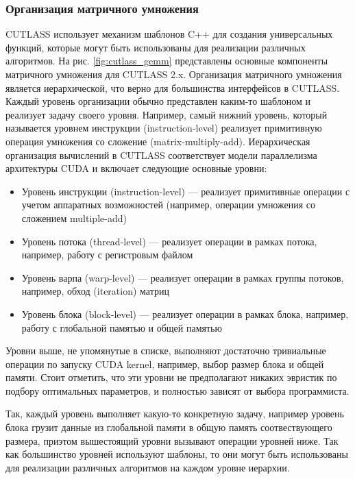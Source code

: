 \subsubsection{Организация матричного умножения}
CUTLASS использует механизм шаблонов C++ для создания универсальных функций, которые могут быть использованы для реализации различных алгоритмов.
На рис. \ref{fig:cutlass_gemm} представлены основные компоненты матричного умножения для CUTLASS 2.x. Организация матричного умножения является иерархической,
что верно для большинства интерфейсов в CUTLASS. Каждый уровень организации обычно представлен каким-то шаблоном и реализует задачу своего уровня. Например,
самый нижний уровень, который называется уровнем инструкции (instruction-level) реализует примитивную операция умножения со сложение (matrix-multiply-add).
Иерархическая организация вычислений в CUTLASS соответствует модели параллелизма архитектуры CUDA и включает следующие основные уровни:
\begin{itemize}
    \item Уровень инструкции (instruction-level) — реализует примитивные операции с учетом аппаратных возможностей (например, операции умножения со сложением multiple-add)
    \item Уровень потока (thread-level) — реализует операции в рамках потока, например, работу с регистровым файлом
    \item Уровень варпа (warp-level) — реализует операции в рамках группы потоков, например, обход (iteration) матриц
    \item Уровень блока (block-level) — реализует операции в рамках блока, например, работу с глобальной памятью и общей памятью
\end{itemize}

Уровни выше, не упомянутые в списке, выполняют достаточно тривиальные операции по запуску CUDA kernel, например, выбор размер блока и
общей памяти. Стоит отметить, что эти уровни не предполагают никаких эвристик по подбору оптимальных параметров, и полностью зависят от
выбора программиста.

Так, каждый уровень выполняет какую-то конкретную задачу, например уровень блока грузит данные из
глобальной памяти в общую память соотвествующего размера, приэтом вышестоящий уровни вызывают операции уровней ниже.
Так как большинство уровней используют шаблоны, то они могут быть использованы для реализации различных алгоритмов на каждом уровне
иерархии.

